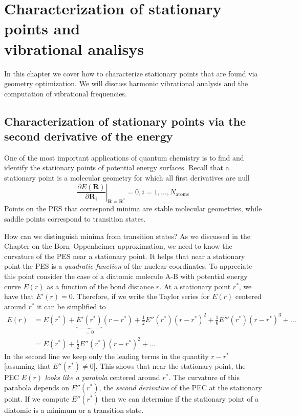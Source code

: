 \documentclass[../Main/chem371-notes.tex]{subfiles}
\begin{document}
\chapter{Characterization of stationary points and\\ vibrational analisys}

In this chapter we cover how to characterize stationary points that are found via geometry optimization.
We will discuss harmonic vibrational analysis and the computation of vibrational frequencies.

\section{Characterization of stationary points via the second derivative of the energy}

One of the most important applications of quantum chemistry is to find and identify the stationary points of  potential energy surfaces.
Recall that a stationary point is a molecular geometry for which all first derivatives are null
\begin{equation}
\left.\frac{\partial E(\mathbf{R})}{\partial \mathbf{R}_i}\right|_{\mathbf{R}=\mathbf{R}^*} = 0, i=1,\ldots,N_\mathrm{atoms}
\end{equation}
Points on the PES that correspond minima are stable molecular geometries, while saddle points correspond to transition states.

How can we distinguish minima from transition states? As we discussed in the Chapter on the Born--Oppenheimer approximation, we need to know the curvature of the PES near a stationary point.
It helps that near a stationary point the PES is a \emph{quadratic function} of the nuclear coordinates.
To appreciate this point consider the case of a diatomic molecule A-B with potential energy curve $E(r)$ as a function of the bond distance $r$.
At a stationary point $r^*$, we have that $E'(r) = 0$.
Therefore, if we write the Taylor series for $E(r)$ centered around $r^*$ it can be simplified to 
\begin{equation}
\begin{split}
E(r) & = E(r^*) + \underbrace{E'(r^*)}_{=0} (r - r^*) + \frac{1}{2} E''(r^*) (r - r^*)^2 + \frac{1}{6} E'''(r^*) (r - r^*)^3 + \ldots \\
& = E(r^*) + \frac{1}{2} E''(r^*) (r - r^*)^2 + \ldots
\end{split}
\end{equation}
In the second line we keep only the leading terms in the quantity $r - r^*$ [assuming that $E''(r^*) \neq 0$].
This shows that near the stationary point, the PEC $E(r)$ \emph{looks like a parabola} centered around $r^*$.
The curvature of this parabola depends on $E''(r^*)$, the \emph{second derivative} of the PEC at the stationary point.
If we compute $E''(r^*)$ then we can determine if the stationary point of a diatomic is a minimum or a transition state.
\end{document}
